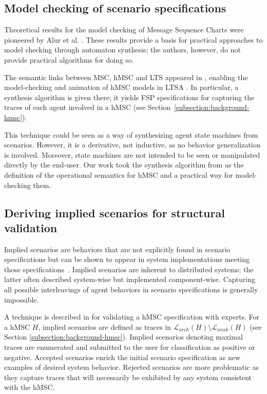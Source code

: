 
\subsection{Model checking of scenario specifications\label{section:related-for-analysis-2}}

Theoretical results for the model checking of Message Sequence Charts were pioneered by Alur et al. \cite{Alur:1999, Alur:2000}. These results provide a basis for practical approaches to model checking through automaton synthesis; the authors, however, do not provide practical algorithms for doing so.

The semantic links between MSC, hMSC and LTS appeared in \cite{Uchitel:2001, Uchitel:2001b}, enabling the model-checking and animation of hMSC models in LTSA \cite{Uchitel:2003, Magee:1999}. In particular, a synthesis algorithm is given there; it yields FSP specifications for capturing the traces of each agent involved in a hMSC (see Section~\ref{subsection:background-hmsc}). 

This technique could be seen as a way of synthesizing agent state machines from scenarios. However, it is a derivative, not inductive, as no behavior generalization is involved. Moreover, state machines are not intended to be seen or manipulated directly by the end-user. Our work took the synthesis algorithm from \cite{Uchitel:2003} as the definition of the operational semantics for hMSC and a practical way for model-checking them.


\subsection{Deriving implied scenarios for structural validation\label{section:related-for-analysis-3}}

Implied scenarios are behaviors that are not explicitly found in scenario specifications but can be shown to appear in system implementations meeting those specifications~\cite{Alur:2000, Uchitel:2004}. Implied scenarios are inherent to distributed systems; the latter often described system-wise but implemented component-wise. Capturing all possible interleavings of agent behaviors in scenario specifications is generally impossible.

A technique is described in \cite{Uchitel:2004} for validating a hMSC specification with experts. For a hMSC $H$, implied scenarios are defined as traces in $\mathcal{L}_{arch}(H) \setminus \mathcal{L}_{weak}(H)$ (see Section \ref{subsection:background-hmsc}). Implied scenarios denoting maximal traces are enumerated and submitted to the user for classification as positive or negative. Accepted scenarios enrich the initial scenario specification as new examples of desired system behavior. Rejected scenarios are more problematic as they capture traces that will necessarily be exhibited by any system consistent with the hMSC.

